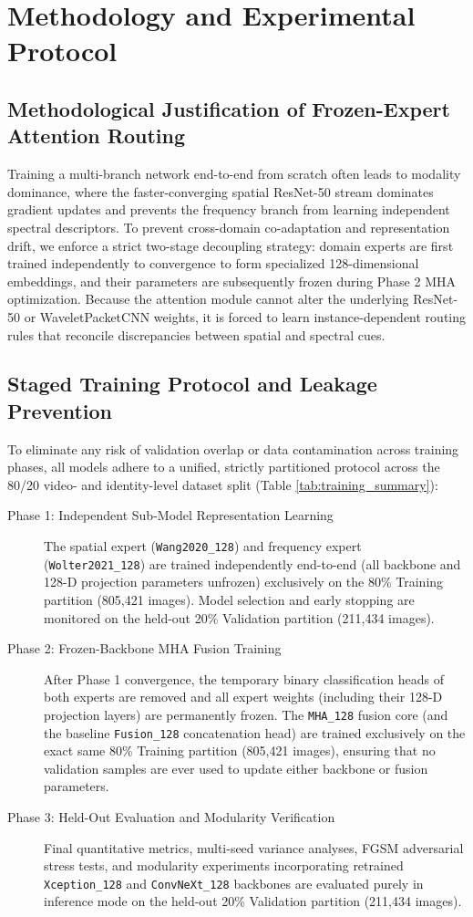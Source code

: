 \documentclass[fleqn,10pt]{wlscirep}
\begin{document}
\section*{Methodology and Experimental Protocol}
\subsection*{Methodological Justification of Frozen-Expert Attention Routing}
Training a multi-branch network end-to-end from scratch often leads to modality dominance, where the faster-converging spatial ResNet-50 stream dominates gradient updates and prevents the frequency branch from learning independent spectral descriptors. To prevent cross-domain co-adaptation and representation drift, we enforce a strict two-stage decoupling strategy: domain experts are first trained independently to convergence to form specialized 128-dimensional embeddings, and their parameters are subsequently frozen during Phase 2 MHA optimization. Because the attention module cannot alter the underlying ResNet-50 or WaveletPacketCNN weights, it is forced to learn instance-dependent routing rules that reconcile discrepancies between spatial and spectral cues.

\subsection*{Staged Training Protocol and Leakage Prevention}
To eliminate any risk of validation overlap or data contamination across training phases, all models adhere to a unified, strictly partitioned protocol across the 80/20 video- and identity-level dataset split (Table \ref{tab:training_summary}):
\begin{description}
\item[Phase 1: Independent Sub-Model Representation Learning] The spatial expert (\texttt{Wang2020\_128}) and frequency expert (\texttt{Wolter2021\_128}) are trained independently end-to-end (all backbone and 128-D projection parameters unfrozen) exclusively on the 80\% Training partition (805,421 images). Model selection and early stopping are monitored on the held-out 20\% Validation partition (211,434 images).
\item[Phase 2: Frozen-Backbone MHA Fusion Training] After Phase 1 convergence, the temporary binary classification heads of both experts are removed and all expert weights (including their 128-D projection layers) are permanently frozen. The \texttt{MHA\_128} fusion core (and the baseline \texttt{Fusion\_128} concatenation head) are trained exclusively on the exact same 80\% Training partition (805,421 images), ensuring that no validation samples are ever used to update either backbone or fusion parameters.
\item[Phase 3: Held-Out Evaluation and Modularity Verification] Final quantitative metrics, multi-seed variance analyses, FGSM adversarial stress tests, and modularity experiments incorporating retrained \texttt{Xception\_128} and \texttt{ConvNeXt\_128} backbones are evaluated purely in inference mode on the held-out 20\% Validation partition (211,434 images).
\end{description}
\end{document}
